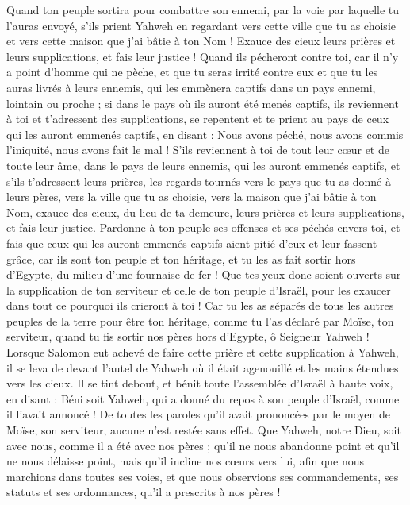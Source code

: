 \begin{multicols}{2}
Quand ton peuple sortira pour combattre son ennemi, par la voie par laquelle tu l’auras envoyé, s'ils prient Yahweh en regardant vers cette ville que tu as choisie et vers cette maison que j'ai bâtie à ton Nom !
Exauce des cieux leurs prières et leurs supplications, et fais leur justice !
Quand ils pécheront contre toi, car il n'y a point d'homme qui ne pèche, et que tu seras irrité contre eux et que tu les auras livrés à leurs ennemis, qui les emmènera captifs dans un pays ennemi, lointain ou proche ;
si dans le pays où ils auront été menés captifs, ils reviennent à toi et t’adressent des supplications, se repentent et te prient au pays de ceux qui les auront emmenés captifs, en disant : Nous avons péché, nous avons commis l’iniquité, nous avons fait le mal !
S'ils reviennent à toi de tout leur cœur et de toute leur âme, dans le pays de leurs ennemis, qui les auront emmenés captifs, et s'ils t'adressent leurs prières, les regards tournés vers le pays que tu as donné à leurs pères, vers la ville que tu as choisie, vers la maison que j'ai bâtie à ton Nom,
exauce des cieux, du lieu de ta demeure, leurs prières et leurs supplications, et fais-leur justice.
Pardonne à ton peuple ses offenses et ses péchés envers toi, et fais que ceux qui les auront emmenés captifs aient pitié d'eux et leur fassent grâce,
car ils sont ton peuple et ton héritage, et tu les as fait sortir hors d'Egypte, du milieu d'une fournaise de fer !
Que tes yeux donc soient ouverts sur la supplication de ton serviteur et celle de ton peuple d'Israël, pour les exaucer dans tout ce pourquoi ils crieront à toi !
Car tu les as séparés de tous les autres peuples de la terre pour être ton héritage, comme tu l’as déclaré par Moïse, ton serviteur, quand tu fis sortir nos pères hors d'Egypte, ô Seigneur Yahweh !
Lorsque Salomon eut achevé de faire cette prière et cette supplication à Yahweh, il se leva de devant l'autel de Yahweh où il était agenouillé et les mains étendues vers les cieux.
Il se tint debout, et bénit toute l'assemblée d'Israël à haute voix, en disant :
Béni soit Yahweh, qui a donné du repos à son peuple d'Israël, comme il l’avait annoncé ! De toutes les paroles qu'il avait prononcées par le moyen de Moïse, son serviteur, aucune n’est restée sans effet.
Que Yahweh, notre Dieu, soit avec nous, comme il a été avec nos pères ; qu'il ne nous abandonne point et qu'il ne nous délaisse point,
mais qu'il incline nos cœurs vers lui, afin que nous marchions dans toutes ses voies, et que nous observions ses commandements, ses statuts et ses ordonnances, qu'il a prescrits à nos pères !

\end{multicols}
